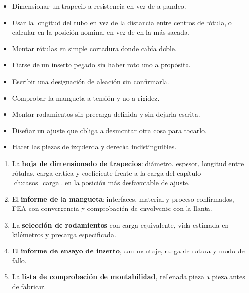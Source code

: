 \begin{ojo}
\begin{itemize}
  \item Dimensionar un trapecio a resistencia en vez de a pandeo.
  \item Usar la longitud del tubo en vez de la distancia entre centros de
        rótula, o calcular en la posición nominal en vez de en la más sacada.
  \item Montar rótulas en simple cortadura donde cabía doble.
  \item Fiarse de un inserto pegado sin haber roto uno a propósito.
  \item Escribir una designación de aleación sin confirmarla.
  \item Comprobar la mangueta a tensión y no a rigidez.
  \item Montar rodamientos sin precarga definida y sin dejarla escrita.
  \item Diseñar un ajuste que obliga a desmontar otra cosa para tocarlo.
  \item Hacer las piezas de izquierda y derecha indistinguibles.
\end{itemize}
\end{ojo}

\begin{entregable}
\begin{enumerate}
  \item La \textbf{hoja de dimensionado de trapecios}: diámetro, espesor,
        longitud entre rótulas, carga crítica y coeficiente frente a la carga
        del capítulo \ref{ch:casos_carga}, en la posición más desfavorable de
        ajuste.
  \item El \textbf{informe de la mangueta}: interfaces, material y proceso
        confirmados, FEA con convergencia y comprobación de envolvente con la
        llanta.
  \item La \textbf{selección de rodamientos} con carga equivalente, vida
        estimada en kilómetros y precarga especificada.
  \item El \textbf{informe de ensayo de inserto}, con montaje, carga de rotura y
        modo de fallo.
  \item La \textbf{lista de comprobación de montabilidad}, rellenada pieza a
        pieza antes de fabricar.
\end{enumerate}
\end{entregable}

